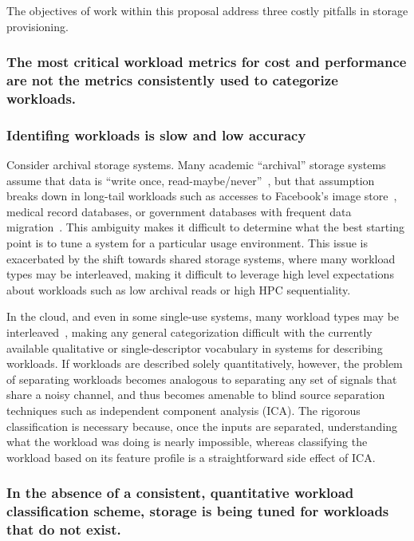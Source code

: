 The objectives of work within this proposal address three costly pitfalls in
storage provisioning.

\subsubsection*{The most critical workload metrics for cost and performance are not the
metrics consistently used to categorize workloads.}



\subsubsection*{Identifing workloads is slow and low accuracy}

Consider archival storage systems. Many academic
``archival'' storage systems assume that data is ``write once,
read-maybe/never''~\cite{storerfast2008,venti,deepstore}, but that assumption
breaks down in long-tail workloads such as accesses to Facebook's image
store~\cite{facebook-photocache-SOSP}, medical record databases,  or government databases with frequent
data migration~\cite{ian-tos}.  
This ambiguity makes it difficult to determine
what the best starting point is to tune a system for a particular usage
environment.  %
This issue is exacerbated by the
shift towards shared storage systems, where many workload types may be
interleaved, making it difficult to leverage high level expectations about
workloads such as low archival reads or high HPC sequentiality.%


In the cloud, and even in some single-use systems, many workload types may be
interleaved~\cite{TK}, making any general categorization difficult with the
currently available qualitative or single-descriptor vocabulary in systems for
describing workloads. If workloads are described solely quantitatively, however,
the problem of separating workloads becomes analogous to separating any set of
signals that share a noisy channel, and thus becomes amenable to blind source
separation techniques such as independent component analysis (ICA). The rigorous
classification is necessary because, once the inputs are separated,
understanding what the workload was doing is nearly impossible, whereas
classifying the workload based on its feature profile is a straightforward side
effect of ICA.

\subsubsection*{In the absence of a consistent, quantitative workload classification scheme, storage is being tuned for workloads that do not exist.}

